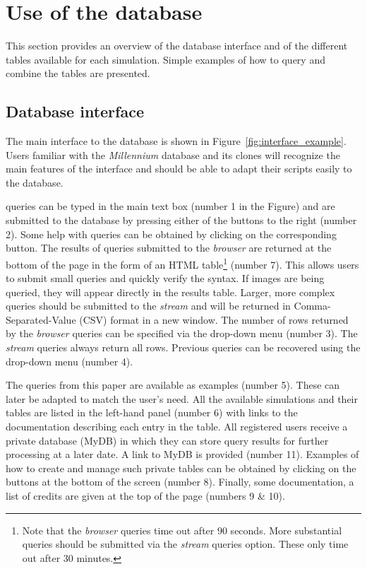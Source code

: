 %
\section{Use of the database}
\label{database_usage}

This section provides an overview of the database interface and of the different
tables available for each simulation. Simple examples of how to query and
combine the tables are presented.

\subsection{Database interface}

The main interface to the \eagle database is shown in
Figure~\ref{fig:interface_example}. Users familiar with the {\it Millennium}
database \citep{Lemson2006b} and its clones will recognize the main features of
the interface and should be able to adapt their scripts easily to the \eagle database.

\sql queries can be typed in the main text box (number 1 in the Figure) and are
submitted to the database by pressing either of the buttons to the right (number
2). Some help with \sql queries can be obtained by clicking on the corresponding
button. The results of queries submitted to the \emph{browser} are returned at
the bottom of the page in the form of an HTML table\footnote{Note that the
  \emph{browser} queries time out after $90$ seconds. More substantial queries
  should be submitted via the \emph{stream} queries option. These only time out
  after $30$ minutes.} (number 7). This allows users to submit small queries and quickly
verify the syntax. If images are being queried, they will appear directly in the
results table. Larger, more complex queries should be submitted to the
\emph{stream} and will be returned in Comma-Separated-Value (CSV) format in a
new window. The number of rows returned by the \emph{browser} queries can be
specified via the drop-down menu (number 3). The \emph{stream} queries always
return all rows. Previous queries can be recovered using the drop-down
menu (number 4).

The queries from this paper are available as examples (number 5). These can
later be adapted to match the user's need. All the available simulations and
their tables are listed in the left-hand panel (number 6) with links to the
documentation describing each entry in the table. All registered users receive a
private database (MyDB) in which they can store query results for further
processing at a later date. A link to MyDB is provided (number 11). Examples of
how to create and manage such private tables can be obtained by clicking on the
buttons at the bottom of the screen (number 8). Finally, some documentation, a
list of credits are given at the top of the page (numbers 9 \& 10).



